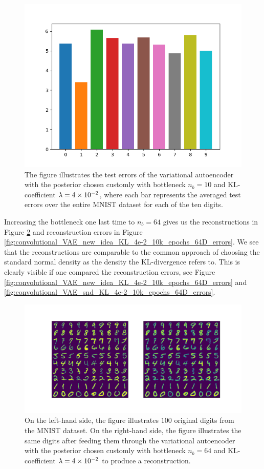 \begin{figure}
\begin{center}
      \includegraphics[width=0.49\linewidth]{convolutional_VAE_new_idea_KL_4e-2_10k_epochs_10D_errors}
\end{center}
\caption{The figure illustrates the test errors of the variational autoencoder with the posterior chosen customly with bottleneck $n_b=10$ and KL-coefficient $\lambda = \num{4e-2}$, where each bar represents the averaged test errors over the entire MNIST dataset for each of the ten digits.}\label{fig:convolutional_VAE_new_idea_KL_4e-2_10k_epochs_10D_errors}
\end{figure}


Increasing the bottleneck one last time to $n_b=64$ gives us the reconstructions in Figure \ref{fig:convolutional_VAE_new_idea_KL_4e-2_10k_epochs_64D_inference} and reconstruction errors in Figure \ref{fig:convolutional_VAE_new_idea_KL_4e-2_10k_epochs_64D_errors}. We see that the reconstructions are comparable to the common approach of choosing the standard normal density as the density the KL-divergence refers to. This is clearly visible if one compared the reconstruction errors, see Figure \ref{fig:convolutional_VAE_new_idea_KL_4e-2_10k_epochs_64D_errors} and \ref{fig:convolutional_VAE_snd_KL_4e-2_10k_epochs_64D_errors}.


\begin{figure}
\begin{center}
      \includegraphics[trim = 15mm 10mm 15mm 15mm, clip, width=\linewidth]{convolutional_VAE_new_idea_KL_4e-2_10k_epochs_64D_inference}
\end{center}
\caption{On the left-hand side, the figure illustrates $100$ original digits from the MNIST dataset. On the right-hand side, the figure illustrates the same digits after feeding them through the variational autoencoder with the posterior chosen customly with bottleneck $n_b=64$ and KL-coefficient $\lambda=\num{4e-2}$ to produce a reconstruction.}\label{fig:convolutional_VAE_new_idea_KL_4e-2_10k_epochs_64D_inference}
\end{figure}


